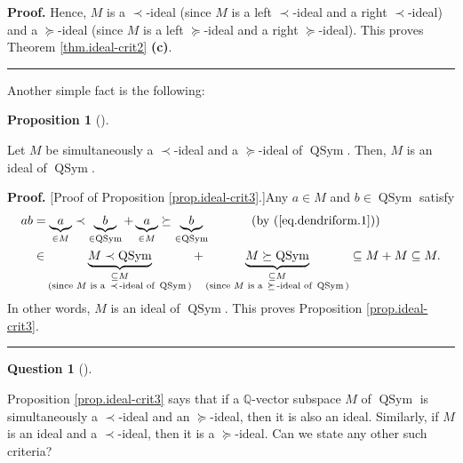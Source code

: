 \documentclass[numbers=enddot,12pt,final,onecolumn,notitlepage]{scrartcl}%
\theoremstyle{definition}
\newtheorem{prop}[theo]{Proposition}
\newenvironment{proposition}[1][]
{\begin{prop}[#1]\begin{leftbar}}
{\end{leftbar}\end{prop}}
\newtheorem{quest}[theo]{Question}
\newenvironment{question}[1][]
{\begin{quest}[#1]\begin{leftbar}}
{\end{leftbar}\end{quest}}
\newenvironment{proof}[1][Proof]{\noindent\textbf{#1.} }{\ \rule{0.5em}{0.5em}}
\newenvironment{question}[1][Question]{\noindent\textbf{#1.} }{\ \rule{0.5em}{0.5em}}
\newenvironment{verlong}{}{}
\begin{document}
\begin{verlong}
\begin{proof}
Hence, $M$ is a $\left.  \prec\right.  $-ideal (since $M$ is a left $\left.
\prec\right.  $-ideal and a right $\left.  \prec\right.  $-ideal) and a
$\left.  \succeq\right.  $-ideal (since $M$ is a left $\left.  \succeq\right.
$-ideal and a right $\left.  \succeq\right.  $-ideal). This proves Theorem
\ref{thm.ideal-crit2} \textbf{(c)}.
\end{proof}

Another simple fact is the following:

\begin{proposition}
\label{prop.ideal-crit3}Let $M$ be simultaneously a $\left.  \prec\right.
$-ideal and a $\left.  \succeq\right.  $-ideal of $\operatorname*{QSym}$.
Then, $M$ is an ideal of $\operatorname*{QSym}$.
\end{proposition}

\begin{proof}
[Proof of Proposition \ref{prop.ideal-crit3}.]Any $a\in M$ and $b\in
\operatorname*{QSym}$ satisfy%
\begin{align*}
ab  &  =\underbrace{a}_{\in M}\left.  \prec\right.  \underbrace{b}%
_{\in\operatorname*{QSym}}+\underbrace{a}_{\in M}\left.  \succeq\right.
\underbrace{b}_{\in\operatorname*{QSym}}\ \ \ \ \ \ \ \ \ \ \left(  \text{by
(\ref{eq.dendriform.1})}\right) \\
&  \in\underbrace{M\left.  \prec\right.  \operatorname*{QSym}}%
_{\substack{\subseteq M\\\text{(since }M\text{ is a }\left.  \prec\right.
\text{-ideal of }\operatorname*{QSym}\text{)}}}+\underbrace{M\left.
\succeq\right.  \operatorname*{QSym}}_{\substack{\subseteq M\\\text{(since
}M\text{ is a }\left.  \succeq\right.  \text{-ideal of }\operatorname*{QSym}%
\text{)}}}\subseteq M+M\subseteq M.
\end{align*}
In other words, $M$ is an ideal of $\operatorname*{QSym}$. This proves
Proposition \ref{prop.ideal-crit3}.
\end{proof}

\begin{question}
Proposition \ref{prop.ideal-crit3} says that if a $\mathbb{Q}$-vector subspace
$M$ of $\operatorname*{QSym}$ is simultaneously a $\left.  \prec\right.
$-ideal and an $\left.  \succeq\right.  $-ideal, then it is also an ideal.
Similarly, if $M$ is an ideal and a $\left.  \prec\right.  $-ideal, then it is
a $\left.  \succeq\right.  $-ideal. Can we state any other such criteria?
\end{question}


\end{verlong}
\end{document}
